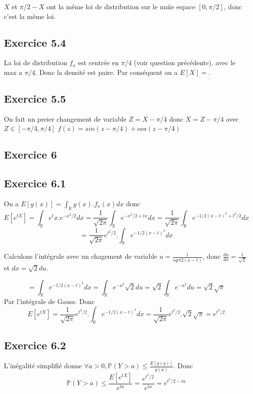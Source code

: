 \documentclass[]{book}
\theoremstyle{definition}
\newcommand{\bb}[1]{\mathbb{#1}}
\newcommand{\R}{\bb{R}}
\newcommand{\Pe}{\bb{P}}
\begin{document}
$X$ et $\pi/2-X$ ont la m\^eme loi de distribution sur le m\^me espace $[0,\pi/2]$, donc c'est la m\^eme loi.

\subsection*{Exercice 5.4}
La loi de distribution $f_x$ est centr\'ee en $\pi/4$ (voir question pr\'ec\'edente). avec le max a $\pi/4$. Donc la densit\'e est paire. Par cons\'equent on a $E[X] = $. 

\subsection*{Exercice 5.5}
On fait un preier changement de variable $Z = X-\pi/4$ donc $X = Z - \pi/4$ avec $Z \in [-\pi/4, \pi/4]$
$f(z) = sin(z-\pi/4) + cos(z-\pi/4)$



\subsection*{Exercice 6}
\subsection*{Exercice 6.1}
On a $E[g(x)] = \int_{\R}{g(x).f_x(x) dx}$ donc
$$
E[e^{tX}] = \int_{\R}{e^tx . e^{-x^2/2} dx} = \frac{1}{\sqrt{2\pi}}\int_{\R}{e^{-x^2/2+tx}dx} = \frac{1}{\sqrt{2\pi}}\int_{\R}{e^{-1/2(x-t)^2+t^2/2}dx}  
$$
$$
= \frac{1}{\sqrt{2\pi}}e^{t^2/2}.\int_{\R}{e^{-1/2(x-t)^2}dx}
$$

Calculons l'int\'egrale avec un chagement de variable $u=\frac{1}{sqrt{2}(x-t)}$, donc $\frac{du}{dx} = \frac{1}{\sqrt{2}}$ et $dx = \sqrt{2}du$.

$$
= \int_{\R}{e^{-1/2(x-t)^2}dx} = \int_{\R}{e^{-u^2}\sqrt{2}du} = \sqrt{2}\int_{\R}{e^{-u^2}du} = \sqrt{2}\sqrt{\pi}
$$
Par l'int\'egrale de Gauss.
Donc
$$
E[e^{tX}] = \frac{1}{\sqrt{2\pi}}e^{t^2/2}.\int_{\R}{e^{-1/2(x-t)^2}dx} = \frac{1}{\sqrt{2\pi}}e^{t^2/2}.\sqrt{2}\sqrt{\pi} = e^{t^2/2}
$$


\subsection*{Exercice 6.2}
L'in\'egalit\'e simplifi\'e donne $\forall a> 0 , \Pe(Y>a) \leq \frac{E[g(y)]}{g(a)}$. Donc
$$
\Pe(Y > a) \leq \frac{E[e^{tX}]}{e^{ta}} = \frac{e^{t^2/2}}{e^{ta}} = e^{t^2/2-ta}
$$
\end{document}
